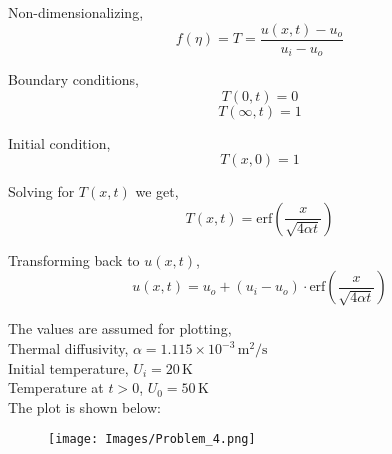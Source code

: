 \documentclass[]{article}
\theoremstyle{definition}
\begin{document}
\begin{enumerate}
Non-dimensionalizing,
\[
f(\eta) = T = \frac{u(x,t) - u_o}{u_i - u_o}
\]

Boundary conditions,
\[
T(0,t) = 0
\]
\[
T(\infty,t) = 1
\]

Initial condition,
\[
T(x,0) = 1
\]

Solving for \(T(x,t)\) we get,
\[
T(x,t) = \text{erf}\left(\frac{x}{\sqrt{4 \alpha t}}\right)
\]

Transforming back to \(u(x,t)\),
\[
\boxed{
u(x,t) = u_o + (u_i - u_o) \cdot \text{erf}\left(\frac{x}{\sqrt{4 \alpha t}}\right)
}
\]

The values are assumed for plotting, \\
Thermal diffusivity, $\alpha = 1.115 \times 10^{-3}\, \text{m}^2/\text{s}$ \\
Initial temperature, $U_i = 20\, \text{K}$ \\
Temperature at $t > 0$, $U_0 = 50\, \text{K}$ \\
\newpage
The plot is shown below:\\
\begin{figure}[H]
    \centering
    \texttt{[image: Images/Problem\_4.png]}
\end{figure}
\end{enumerate}
\end{document}

